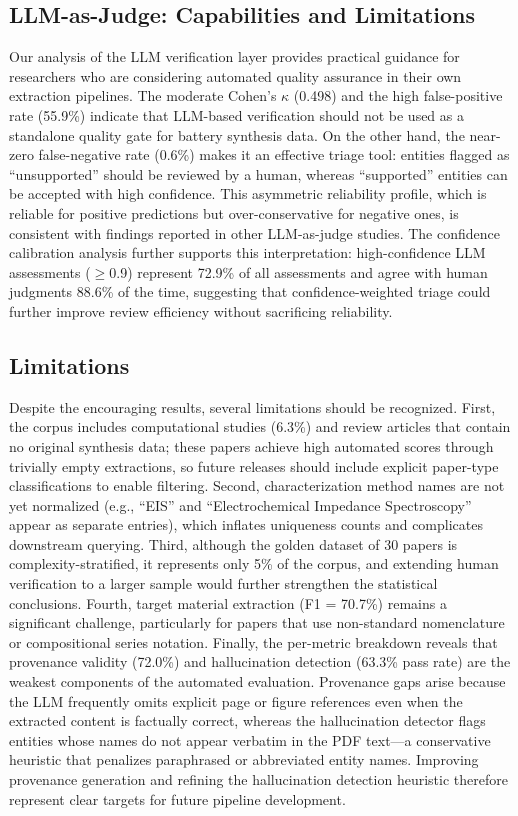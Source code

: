 \documentclass[12pt,a4paper]{article}
\begin{document}
\subsection{LLM-as-Judge: Capabilities and Limitations}

Our analysis of the LLM verification layer provides practical guidance for researchers who are considering automated quality assurance in their own extraction pipelines. The moderate Cohen's $\kappa$ (0.498) and the high false-positive rate (55.9\%) indicate that LLM-based verification should not be used as a standalone quality gate for battery synthesis data. On the other hand, the near-zero false-negative rate (0.6\%) makes it an effective triage tool: entities flagged as ``unsupported'' should be reviewed by a human, whereas ``supported'' entities can be accepted with high confidence. This asymmetric reliability profile, which is reliable for positive predictions but over-conservative for negative ones, is consistent with findings reported in other LLM-as-judge studies.\cite{zheng2024judging} The confidence calibration analysis further supports this interpretation: high-confidence LLM assessments ($\geq$0.9) represent 72.9\% of all assessments and agree with human judgments 88.6\% of the time, suggesting that confidence-weighted triage could further improve review efficiency without sacrificing reliability.

\subsection{Limitations}
\label{sec:limitations}

Despite the encouraging results, several limitations should be recognized. First, the corpus includes computational studies (6.3\%) and review articles that contain no original synthesis data; these papers achieve high automated scores through trivially empty extractions, so future releases should include explicit paper-type classifications to enable filtering. Second, characterization method names are not yet normalized (e.g., ``EIS'' and ``Electrochemical Impedance Spectroscopy'' appear as separate entries), which inflates uniqueness counts and complicates downstream querying. Third, although the golden dataset of 30 papers is complexity-stratified, it represents only 5\% of the corpus, and extending human verification to a larger sample would further strengthen the statistical conclusions. Fourth, target material extraction (F1 = 70.7\%) remains a significant challenge, particularly for papers that use non-standard nomenclature or compositional series notation. Finally, the per-metric breakdown reveals that provenance validity (72.0\%) and hallucination detection (63.3\% pass rate) are the weakest components of the automated evaluation. Provenance gaps arise because the LLM frequently omits explicit page or figure references even when the extracted content is factually correct, whereas the hallucination detector flags entities whose names do not appear verbatim in the PDF text---a conservative heuristic that penalizes paraphrased or abbreviated entity names. Improving provenance generation and refining the hallucination detection heuristic therefore represent clear targets for future pipeline development.
\end{document}
